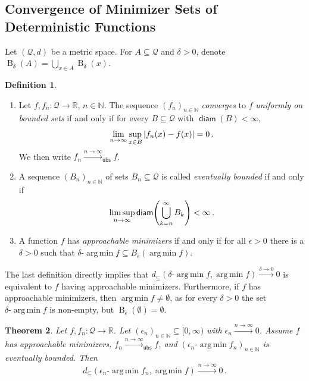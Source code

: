\documentclass{scrartcl}
\renewcommand{\subset}{\subseteq}
\DeclareMathOperator{\diam}{\mathsf{diam}}
\DeclareMathOperator{\ball}{\mathrm{B}}
\newcommand*{\mc}[1]{\mathcal{#1}}
\newcommand{\N}{\mathbb{N}}
\newcommand{\R}{\mathbb{R}}
\newcommand{\equationFullstop}{\, .}
\newcommand{\eqfs}{\equationFullstop}
\DeclareMathOperator*{\argmin}{arg\,min}
\def\MS{\mathcal{Q}}\def\epi{\mathsf{epi}}\def\aec{\mathsf{aec}}\def\alsec{\mathsf{alsec}}\def\aecp{\mathsf{aec}_P}\def\Hausdorff{\mathsf{H}}\def\Haus{\mathsf{H}}\def\ubs{\mathsf{ubs}}\newcommand{\epiconv}[1]{\xrightarrow{#1\to\infty}_\epi}\newcommand{\hausconv}[1]{\xrightarrow{#1\to\infty}_\Hausdorff}\newcommand{\ubsconv}[1]{\xrightarrow{#1\to\infty}_\ubs}\newcommand{\ol}[2]{\overline{#1,\!#2}}
\theoremstyle{plain}\newtheorem{theorem}{Theorem}[section]
\theoremstyle{definition}
\newtheorem{definition}[theorem]{Definition}
\theoremstyle{remark}
\begin{document}
\begin{appendix}
\subsection{Convergence of Minimizer Sets of Deterministic Functions}\label{ssec:alt:det}
Let $(\mc Q, d)$ be a metric space. For $A\subset \mc Q$ and $\delta>0$, denote $\ball_\delta(A) = \bigcup_{x\in A} \ball_\delta(x)$. 
\begin{definition} \mbox{ }
	\begin{enumerate}[label=(\roman*)]
	\item 
		Let $f,f_n \colon \MS\to\R$, $n\in\N$.
		The sequence $(f_n)_{n\in\N}$  \emph{converges} to $f$ \emph{uniformly on bounded sets} if and only if for every $B\subset \MS$ with $\diam(B)<\infty$,
		\begin{equation*}
		\lim_{n\to\infty} \sup_{x\in B}\abs{f_n(x) - f(x)} =0
		\eqfs
		\end{equation*}
		We then write $f_n\ubsconv{n}f$.
	\item 
		A sequence $(B_n)_{n\in\N}$ of sets $B_n \subset \MS$ is called \emph{eventually bounded} if and only if
		\begin{equation*}
		\limsup_{n\to\infty} \diam\brOf{\bigcup_{k=n}^\infty B_k} < \infty
		\eqfs
		\end{equation*}
	\item 
		A function $f$ has \emph{approachable minimizers} if and only if for all $\epsilon >0$ there is a $\delta>0$ such that
		$\delta\text{-}\argmin f \subset B_\epsilon(\argmin f)$.
	\end{enumerate}	
\end{definition}
The last definition directly implies that $d_\subset(\delta\text{-}\argmin f, \argmin f) \xrightarrow{\delta\to0} 0$ is equivalent to $f$ having approachable minimizers. Furthermore, if $f$ has approachable minimizers, then $\argmin f \neq \emptyset$, as for every $\delta>0$ the set $\delta\text{-}\argmin f$ is non-empty, but $\ball_\epsilon(\emptyset)=\emptyset$.
\begin{theorem}\label{thm:alt:convOfMini}
	Let $f,f_n \colon \MS\to\R$. Let $(\epsilon_n)_{n\in\N}\subset [0,\infty)$ with $\epsilon_n \xrightarrow{n\to\infty}0$. 
	Assume $f$ has approachable minimizers, $f_n \xrightarrow{n\to\infty}_{\ubs} f$, and $(\epsilon_n\text{-}\argmin f_n)_{n\in\N}$ is eventually bounded.
	Then
	\begin{equation*}
		d_\subset(\epsilon_n\text{-}\argmin f_n, \argmin f)\xrightarrow{n\to\infty}
		0
		\eqfs
	\end{equation*}

\end{theorem}
\end{appendix}
\end{document}
